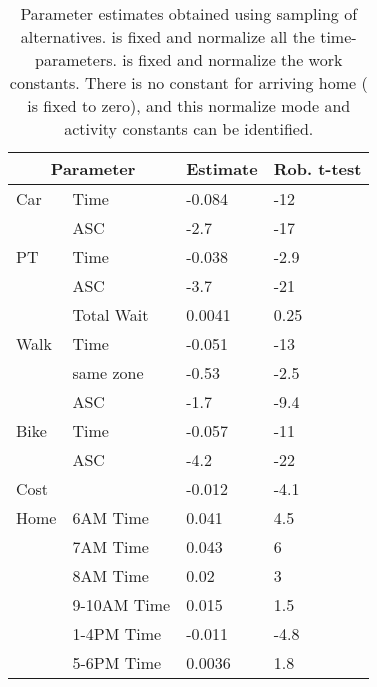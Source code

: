 \begin{table}
	\caption{Parameter estimates obtained using sampling of alternatives.  is fixed and normalize all the time-parameters.  is fixed and normalize the work constants. There is no constant for arriving home ( is fixed to zero), and this normalize mode and activity constants can be identified. \label{tab:est1}}
\centering
\begin{tabular}{llll} 
\toprule
 \multicolumn{2}{c}{Parameter} & Estimate  & Rob. t-test       \\
\midrule
            Car &                     Time &     -0.084 &        -12 \\ 
                &                      ASC &       -2.7 &        -17 \\ 
\noalign{\smallskip}
             PT &                     Time &     -0.038 &       -2.9 \\ 
                &                      ASC &       -3.7 &        -21 \\ 
                &               Total Wait &     0.0041 &       0.25 \\ 
\noalign{\smallskip}
           Walk &                     Time &     -0.051 &        -13 \\ 
                &                same zone &      -0.53 &       -2.5 \\ 
                &                      ASC &       -1.7 &       -9.4 \\ 
\noalign{\smallskip}
           Bike &                     Time &     -0.057 &        -11 \\ 
                &                      ASC &       -4.2 &        -22 \\ 
\noalign{\smallskip}
           Cost &                          &     -0.012 &       -4.1 \\ 
\noalign{\smallskip}
           Home &                 6AM Time &      0.041 &        4.5 \\ 
                &                 7AM Time &      0.043 &          6 \\ 
                &                 8AM Time &       0.02 &          3 \\ 
                &              9-10AM Time &      0.015 &        1.5 \\   
                &		        1-4PM Time &     -0.011 &       -4.8 \\ 
                &                 5-6PM Time &     0.0036 &        1.8 \\ 

\end{tabular}
\end{table}
